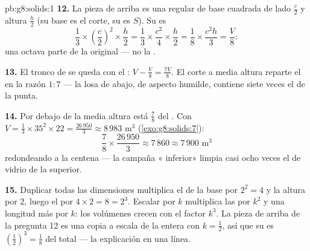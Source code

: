 \begin{solution}{pb:g8:solids:1}
\textbf{12.} La pieza de arriba es una  regular de base cuadrada de
lado $\frac c2$ y altura $\frac h2$ (su base es el corte,
su  es $S$). Su  es
\[
\frac13 \times \left(\frac c2\right)^2 \times \frac h2
= \frac13 \times \frac{c^2}{4} \times \frac h2
= \frac{1}{8} \times \frac{c^2 h}{3}
= \frac{V}{8} :
\]
una octava parte de la original --- no la .

\textbf{13.} El tronco de  se queda con el :
$V - \frac V8 = \frac{7V}{8}$. El corte a media altura reparte el
 en la razón $1 : 7$ --- la losa de abajo, de aspecto humilde,
contiene siete veces el  de la punta.

\textbf{14.} Por debajo de la media altura está $\frac78$ del . Con
$V = \frac13 \times 35^2 \times 22 = \frac{26\,950}{3} \approx
8\,983$ m$^3$ (\cref{exo:g8:solids:7}):
\[
\frac78 \times \frac{26\,950}{3} \approx 7\,860 \approx
7\,900 \text{ m}^3
\]
redondeando a la centena --- la campaña « inferior» limpia
casi ocho veces el  de vidrio de la superior.

\textbf{15.} Duplicar todas las dimensiones multiplica el  de la base por
$2^2 = 4$ y la altura por $2$, luego el  por
$4 \times 2 = 8 = 2^3$. Escalar por $k$ multiplica las  por $k^2$
y una longitud más por $k$: los volúmenes crecen con el factor $k^3$. La
pieza de arriba de la pregunta 12 es una copia a escala de la  entera
con $k = \frac12$, así que su  es
$\left(\frac12\right)^3 = \frac18$ del total --- la explicación
en una línea.
\end{solution}
